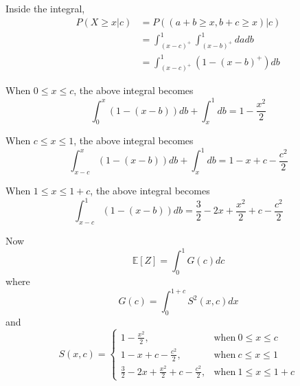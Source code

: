 \documentclass[12pt]{simple_doc}
\begin{document}
    Inside the integral,
    \begin{equation}
        \begin{aligned}
        P(X \geqslant x | c) &= P((a + b \geqslant x, b + c \geqslant x)|c)\\
            &= \int_{(x-c)^+}^1 \int_{(x-b)^+}^1 da db\\
            &= \int_{(x-c)^+}^1 (1 - (x-b)^+) db
        \end{aligned}
    \end{equation}

    When $0 \leqslant x \leqslant c$, the above integral becomes
    \begin{equation}
        \int_0^x (1 - (x-b)) db + \int_x^1 db = 1 - \frac{x^2}{2}
    \end{equation}

    When $c \leqslant x \leqslant 1$, the above integral becomes
    \begin{equation}
        \int_{x-c}^x (1 - (x-b)) db + \int_x^1 db = 1 - x + c - \frac{c^2}{2}
    \end{equation}

    When $1 \leqslant x \leqslant 1 + c$, the above integral becomes
    \begin{equation}
        \int_{x-c}^1 (1 - (x-b)) db = \frac{3}{2} - 2x + \frac{x^2}{2} + c - \frac{c^2}{2}
    \end{equation}

    Now
    \begin{equation}
        \mathbb{E}[Z] = \int_0^1 G(c) dc
    \end{equation}
    where
    \begin{equation}
        G(c) = \int_0^{1 + c} S^2(x, c) dx
    \end{equation}
    and
    \begin{equation}
        S(x, c) =
            \begin{cases}
              1 - \frac{x^2}{2}, & \text{when}\ 0 \leqslant x \leqslant c\\
              1 - x + c - \frac{c^2}{2}, & \text{when}\ c \leqslant x \leqslant 1\\
              \frac{3}{2} - 2x + \frac{x^2}{2} + c - \frac{c^2}{2}, & \text{when}\ 1 \leqslant x \leqslant 1 + c
            \end{cases}
    \end{equation}
\end{document}
